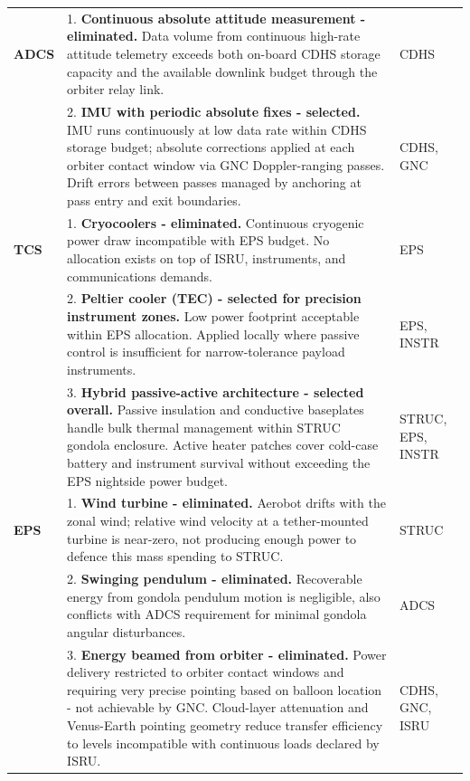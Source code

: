 {\begin{longtable}{@{} p{1.8cm} p{11cm} p{2.5cm} @{}}
\midrule
\textbf{ADCS} &
1. \textbf{Continuous absolute attitude measurement - eliminated.} Data volume from continuous high-rate attitude telemetry exceeds both on-board CDHS storage capacity and the available downlink budget through the orbiter relay link.
& CDHS \\[6pt]

&
2. \textbf{IMU with periodic absolute fixes - selected.} IMU runs continuously at low data rate within CDHS storage budget; absolute corrections applied at each orbiter contact window via GNC Doppler-ranging passes. Drift errors between passes managed by anchoring at pass entry and exit boundaries.
& CDHS, GNC \\[6pt]
\midrule
\textbf{TCS} &
1. \textbf{Cryocoolers - eliminated.} Continuous cryogenic power draw incompatible with EPS budget. No allocation exists on top of ISRU, instruments, and communications demands.
& EPS \\[6pt]

&
2. \textbf{Peltier cooler (TEC) - selected for precision instrument zones.} Low power footprint acceptable within EPS allocation. Applied locally where passive control is insufficient for narrow-tolerance payload instruments.
& EPS, INSTR \\[6pt]

&
3. \textbf{Hybrid passive-active architecture - selected overall.} Passive insulation and conductive baseplates handle bulk thermal management within STRUC gondola enclosure. Active heater patches cover cold-case battery and instrument survival without exceeding the EPS nightside power budget.
& STRUC, EPS, INSTR \\[6pt]
\midrule
\textbf{EPS} &
1. \textbf{Wind turbine - eliminated.} Aerobot drifts with the zonal wind; relative wind velocity at a tether-mounted turbine is near-zero, not producing enough power to defence this mass spending to STRUC.
& STRUC \\[6pt]

&
2. \textbf{Swinging pendulum - eliminated.} Recoverable energy from gondola pendulum motion is negligible, also conflicts with ADCS requirement for minimal gondola angular disturbances.
& ADCS \\[6pt]

&
3. \textbf{Energy beamed from orbiter - eliminated.} Power delivery restricted to orbiter contact windows and requiring very precise pointing based on balloon location - not achievable by GNC. Cloud-layer attenuation and Venus-Earth pointing geometry reduce transfer efficiency to levels incompatible with continuous loads declared by ISRU.
& CDHS, GNC, ISRU \\[6pt]


\end{longtable}}
